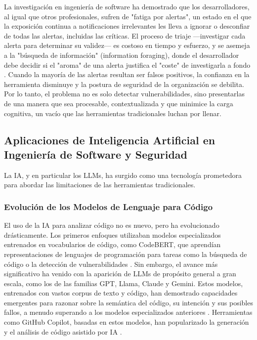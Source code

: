 La investigación en ingeniería de software ha demostrado que los desarrolladores, al igual que otros profesionales, sufren de "fatiga por alertas", un estado en el que la exposición continua a notificaciones irrelevantes les lleva a ignorar o desconfiar de todas las alertas, incluidas las críticas. El proceso de triaje —investigar cada alerta para determinar su validez— es costoso en tiempo y esfuerzo, y se asemeja a la "búsqueda de información" (information foraging), donde el desarrollador debe decidir si el "aroma" de una alerta justifica el "coste" de investigarla a fondo \cite{Parnin2011InformationForaging}. Cuando la mayoría de las alertas resultan ser falsos positivos, la confianza en la herramienta disminuye y la postura de seguridad de la organización se debilita. Por lo tanto, el problema no es solo detectar vulnerabilidades, sino presentarlas de una manera que sea procesable, contextualizada y que minimice la carga cognitiva, un vacío que las herramientas tradicionales luchan por llenar.

\subsection{Aplicaciones de Inteligencia Artificial en Ingeniería de Software y Seguridad}
La IA, y en particular los LLMs, ha surgido como una tecnología prometedora para abordar las limitaciones de las herramientas tradicionales.

\subsubsection{Evolución de los Modelos de Lenguaje para Código}
El uso de la IA para analizar código no es nuevo, pero ha evolucionado drásticamente. Los primeros enfoques utilizaban modelos especializados entrenados en vocabularios de código, como CodeBERT, que aprendían representaciones de lenguajes de programación para tareas como la búsqueda de código o la detección de vulnerabilidades \cite{6}. Sin embargo, el avance más significativo ha venido con la aparición de LLMs de propósito general a gran escala, como los de las familias GPT, Llama, Claude y Gemini. Estos modelos, entrenados con vastos corpus de texto y código, han demostrado capacidades emergentes para razonar sobre la semántica del código, su intención y sus posibles fallos, a menudo superando a los modelos especializados anteriores \cite{Siddiq2024LLMSurvey}. Herramientas como GitHub Copilot, basadas en estos modelos, han popularizado la generación y el análisis de código asistido por IA \cite{GitHubCopilotFeatures, Wang2022CopilotSecurity}.

